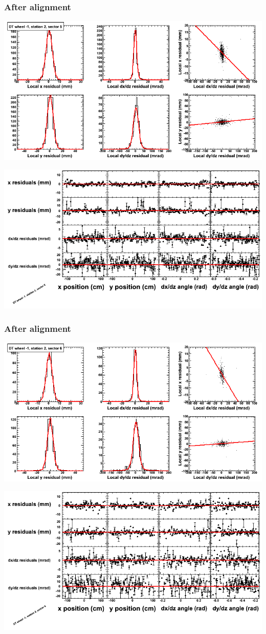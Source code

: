 \documentclass[compress]{beamer}
\begin{document}
\begin{frame}
\frametitle{After alignment}
\includegraphics[width=0.7\linewidth]{NOV4_fitfunctions/MBwhBst2sec05_bellcurves.png}

\includegraphics[width=0.7\linewidth]{NOV4_fitfunctions/MBwhBst2sec05_polynomials.png}
\end{frame}

\begin{frame}
\frametitle{After alignment}
\includegraphics[width=0.7\linewidth]{NOV4_fitfunctions/MBwhBst2sec06_bellcurves.png}

\includegraphics[width=0.7\linewidth]{NOV4_fitfunctions/MBwhBst2sec06_polynomials.png}
\end{frame}
\end{document}
